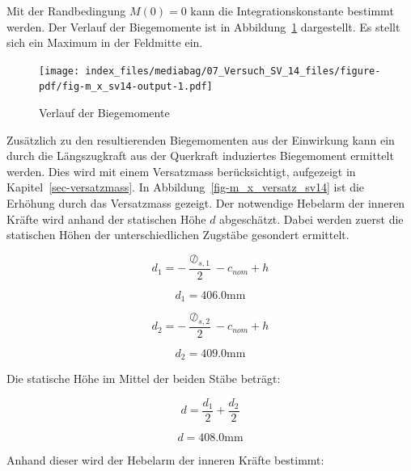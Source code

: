 \documentclass[
  12pt,
  letterpaper,
  egregdoesnotlikesansseriftitles]{scrreprt}
\begin{document}
Mit der Randbedingung \(M(0) = 0\) kann die Integrationskonstante
bestimmt werden. Der Verlauf der Biegemomente ist in
Abbildung~\ref{fig-m_x_sv14} dargestellt. Es stellt sich ein Maximum in
der Feldmitte ein.

\begin{figure}[H]

{\centering \texttt{[image: index\_files/mediabag/07\_Versuch\_SV\_14\_files/figure-pdf/fig-m\_x\_sv14-output-1.pdf]}

}

\caption{\label{fig-m_x_sv14}Verlauf der Biegemomente}

\end{figure}

Zusätzlich zu den resultierenden Biegemomenten aus der Einwirkung kann
ein durch die Längszugkraft aus der Querkraft induziertes Biegemoment
ermittelt werden. Dies wird mit einem Versatzmass berücksichtigt,
aufgezeigt in Kapitel~\ref{sec-versatzmass}. In
Abbildung~\ref{fig-m_x_versatz_sv14} ist die Erhöhung durch das
Versatzmass gezeigt. Der notwendige Hebelarm der inneren Kräfte wird
anhand der statischen Höhe \(d\) abgeschätzt. Dabei werden zuerst die
statischen Höhen der unterschiedlichen Zugstäbe gesondert ermittelt.

\begin{equation}d_{1} = - \frac{\oslash_{s,1}}{2} - c_{nom} + h\end{equation}

\begin{equation}d_{1} = 406.0 \text{mm}\end{equation}

\begin{equation}d_{2} = - \frac{\oslash_{s,2}}{2} - c_{nom} + h\end{equation}

\begin{equation}d_{2} = 409.0 \text{mm}\end{equation}

Die statische Höhe im Mittel der beiden Stäbe beträgt:

\begin{equation}d = \frac{d_{1}}{2} + \frac{d_{2}}{2}\end{equation}

\begin{equation}d = 408.0 \text{mm}\end{equation}

Anhand dieser wird der Hebelarm der inneren Kräfte bestimmt:
\end{document}
